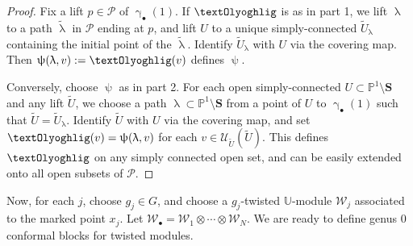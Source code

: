 \documentclass[11pt,b5paper,notitlepage]{article}
\theoremstyle{definition}
\theoremstyle{plain}
\newcommand{\mc}{\mathcal}
\newcommand{\wtd}{\widetilde}
\newcommand{\scr}{\mathscr}
\newcommand{\blt}{\bullet}
\newcommand{\Ubb}{\mathbb U}
\newcommand{\Pbb}{\mathbb P}
\newcommand{\Sbf}{\mathbf{S}}
\numberwithin{equation}{subsection}
\begin{document}
\begin{proof}
Fix a lift $p\in\mc P$ of $\upgamma_\blt(1)$. If $\text{\textOlyoghlig}$ is as in part 1, we lift $\uplambda$ to a path $\wtd\uplambda$ in $\mc P$ ending at $p$, and lift $U$ to a unique simply-connected $\wtd U_\uplambda$ containing the initial point of the $\wtd\uplambda$. Identify $\wtd U_\uplambda$ with $U$ via the covering map. Then $\uppsi(\uplambda,v):=\text{\textOlyoghlig}(v)$ defines $\uppsi$.

Conversely, choose $\uppsi$ as in part 2. For each open simply-connected $U\subset\Pbb^1\setminus\Sbf$ and any lift $\wtd U$, we choose a path $\uplambda\subset\Pbb^1\setminus\Sbf$ from a point of $U$ to $\upgamma_\blt(1)$ such that $\wtd U=\wtd U_\uplambda$.  Identify $\wtd U$ with $U$ via the covering map, and set $\text{\textOlyoghlig}(v)=\uppsi(\uplambda,v)$ for each $v\in\scr U_{\wtd U}(\wtd U)$. This defines $\text{\textOlyoghlig}$ on any simply connected open set, and can be easily extended onto all open subsets of $\mc P$.
\end{proof}




Now, for each $j$, choose $g_j\in G$, and choose a $g_j$-twisted $\Ubb$-module $\mc W_j$ associated to the marked point $x_j$.  Let $\mc W_\blt=\mc W_1\otimes\cdots\otimes\mc W_N$. We are ready to define genus $0$ conformal blocks for twisted modules. 
\end{document}
